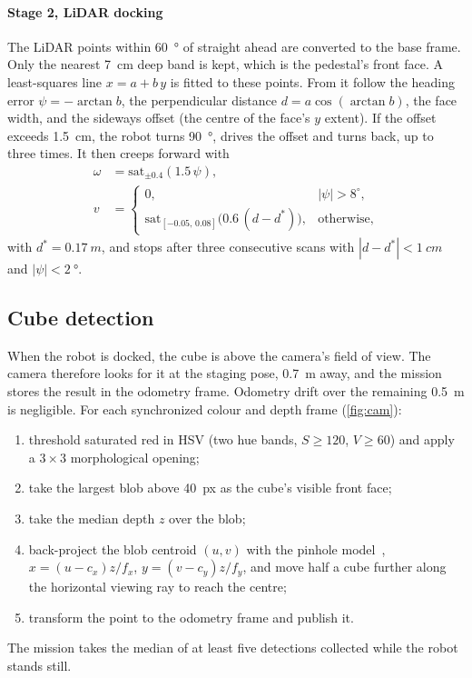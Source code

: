 \documentclass[journal]{IEEEtran}
\begin{document}
\paragraph*{Stage 2, LiDAR docking} The LiDAR points within \SI{60}{\degree} of straight ahead are converted to the base frame. Only the nearest \SI{7}{cm} deep band is kept, which is the pedestal's front face. A least-squares line $x = a + b\,y$ is fitted to these points. From it follow the heading error $\psi = -\arctan b$, the perpendicular distance $d = a\cos(\arctan b)$, the face width, and the sideways offset (the centre of the face's $y$ extent). If the offset exceeds \SI{1.5}{cm}, the robot turns \SI{90}{\degree}, drives the offset and turns back, up to three times. It then creeps forward with
\begin{align}
  \omega &= \mathrm{sat}_{\pm 0.4}(1.5\,\psi),\\
  v &= \begin{cases} 0, & |\psi| > 8^\circ,\\
  \mathrm{sat}_{[-0.05,\,0.08]}\bigl(0.6\,(d - d^\ast)\bigr), & \text{otherwise},\end{cases}
\end{align}
with $d^\ast = \SI{0.17}{m}$, and stops after three consecutive scans with $|d-d^\ast| < \SI{1}{cm}$ and $|\psi| < \SI{2}{\degree}$.

\subsection{Cube detection}
\label{sec:camera}
When the robot is docked, the cube is above the camera's field of view. The camera therefore looks for it at the staging pose, \SI{0.7}{m} away, and the mission stores the result in the odometry frame. Odometry drift over the remaining \SI{0.5}{m} is negligible. For each synchronized colour and depth frame (\cref{fig:cam}):
\begin{enumerate}
  \item threshold saturated red in HSV (two hue bands, $S \geq 120$, $V \geq 60$) and apply a $3{\times}3$ morphological opening;
  \item take the largest blob above \SI{40}{px} as the cube's visible front face;
  \item take the median depth $z$ over the blob;
  \item back-project the blob centroid $(u,v)$ with the pinhole model~\cite{hartley2004mvg}, $x = (u-c_x)z/f_x$, $y = (v-c_y)z/f_y$, and move half a cube further along the horizontal viewing ray to reach the centre;
  \item transform the point to the odometry frame and publish it.
\end{enumerate}
The mission takes the median of at least five detections collected while the robot stands still.
\end{document}
